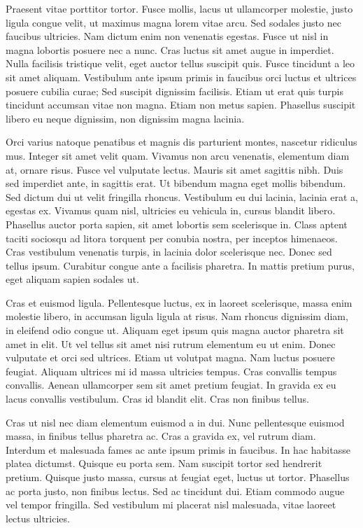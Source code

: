\documentclass[b5paper, 10pt]{book}
\begin{document}
	Praesent vitae porttitor tortor. Fusce mollis, lacus ut ullamcorper molestie, justo ligula congue velit, ut maximus magna lorem vitae arcu. Sed sodales justo nec faucibus ultricies. Nam dictum enim non venenatis egestas. Fusce ut nisl in magna lobortis posuere nec a nunc. Cras luctus sit amet augue in imperdiet. Nulla facilisis tristique velit, eget auctor tellus suscipit quis. Fusce tincidunt a leo sit amet aliquam. Vestibulum ante ipsum primis in faucibus orci luctus et ultrices posuere cubilia curae; Sed suscipit dignissim facilisis. Etiam ut erat quis turpis tincidunt accumsan vitae non magna. Etiam non metus sapien. Phasellus suscipit libero eu neque dignissim, non dignissim magna lacinia.
	
	Orci varius natoque penatibus et magnis dis parturient montes, nascetur ridiculus mus. Integer sit amet velit quam. Vivamus non arcu venenatis, elementum diam at, ornare risus. Fusce vel vulputate lectus. Mauris sit amet sagittis nibh. Duis sed imperdiet ante, in sagittis erat. Ut bibendum magna eget mollis bibendum. Sed dictum dui ut velit fringilla rhoncus. Vestibulum eu dui lacinia, lacinia erat a, egestas ex. Vivamus quam nisl, ultricies eu vehicula in, cursus blandit libero. Phasellus auctor porta sapien, sit amet lobortis sem scelerisque in. Class aptent taciti sociosqu ad litora torquent per conubia nostra, per inceptos himenaeos. Cras vestibulum venenatis turpis, in lacinia dolor scelerisque nec. Donec sed tellus ipsum. Curabitur congue ante a facilisis pharetra. In mattis pretium purus, eget aliquam sapien sodales ut.
	
	Cras et euismod ligula. Pellentesque luctus, ex in laoreet scelerisque, massa enim molestie libero, in accumsan ligula ligula at risus. Nam rhoncus dignissim diam, in eleifend odio congue ut. Aliquam eget ipsum quis magna auctor pharetra sit amet in elit. Ut vel tellus sit amet nisi rutrum elementum eu ut enim. Donec vulputate et orci sed ultrices. Etiam ut volutpat magna. Nam luctus posuere feugiat. Aliquam ultrices mi id massa ultricies tempus. Cras convallis tempus convallis. Aenean ullamcorper sem sit amet pretium feugiat. In gravida ex eu lacus convallis vestibulum. Cras id blandit elit. Cras non finibus tellus.
	
	Cras ut nisl nec diam elementum euismod a in dui. Nunc pellentesque euismod massa, in finibus tellus pharetra ac. Cras a gravida ex, vel rutrum diam. Interdum et malesuada fames ac ante ipsum primis in faucibus. In hac habitasse platea dictumst. Quisque eu porta sem. Nam suscipit tortor sed hendrerit pretium. Quisque justo massa, cursus at feugiat eget, luctus ut tortor. Phasellus ac porta justo, non finibus lectus. Sed ac tincidunt dui. Etiam commodo augue vel tempor fringilla. Sed vestibulum mi placerat nisl malesuada, vitae laoreet lectus ultricies.
	
\end{document}

